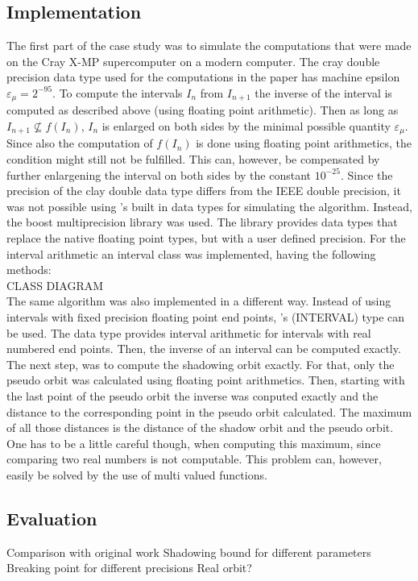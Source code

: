   \subsection{Implementation}
  The first part of the case study was to simulate the computations that were made on the Cray X-MP supercomputer on a modern computer. 
  The cray double precision data type used for the computations in the paper has machine epsilon $\varepsilon_\mu = 2^{-95}$.
  To compute the intervals $I_n$ from $I_{n+1}$ the inverse of the interval is computed as described above (using floating point arithmetic).
  Then as long as $I_{n+1} \not \subseteq f(I_n)$, $I_n$ is enlarged on both sides by the minimal possible quantity $\varepsilon_\mu$. 
  Since also the computation of $f(I_n)$ is done using floating point arithmetics, the condition might still not be fulfilled.
  This can, however, be compensated by further enlargening the interval on both sides by the constant $10^{-25}$.
  Since the precision of the clay double data type differs from the IEEE double precision, it was not possible using \cc's built in data types for simulating the algorithm.
  Instead, the boost multiprecision library \cite{boostmultiprecision} was used. 
  The library provides data types that replace the native \cc floating point types, but with a user defined precision. 
  For the interval arithmetic an interval class was implemented, having the following methods:\\
  CLASS DIAGRAM \\
  The same algorithm was also implemented in a different way. 
  Instead of using intervals with fixed precision floating point end points, \irram's \code(INTERVAL) type can be used. 
  The data type provides interval arithmetic for intervals with real numbered end points.
  Then, the inverse of an interval can be computed exactly.
  The next step, was to compute the shadowing orbit exactly.
  For that, only the pseudo orbit was calculated using floating point arithmetics. 
  Then, starting with the last point of the pseudo orbit the inverse was conputed exactly and the distance to the corresponding point in the pseudo orbit calculated.
  The maximum of all those distances is the distance of the shadow orbit and the pseudo orbit.
  One has to be a little careful though, when computing this maximum, since comparing two real numbers is not computable. 
  This problem can, however, easily be solved by the use of multi valued functions. 
  \subsection{Evaluation}
  Comparison with original work
  Shadowing bound for different parameters
  Breaking point for different precisions
  Real orbit?
